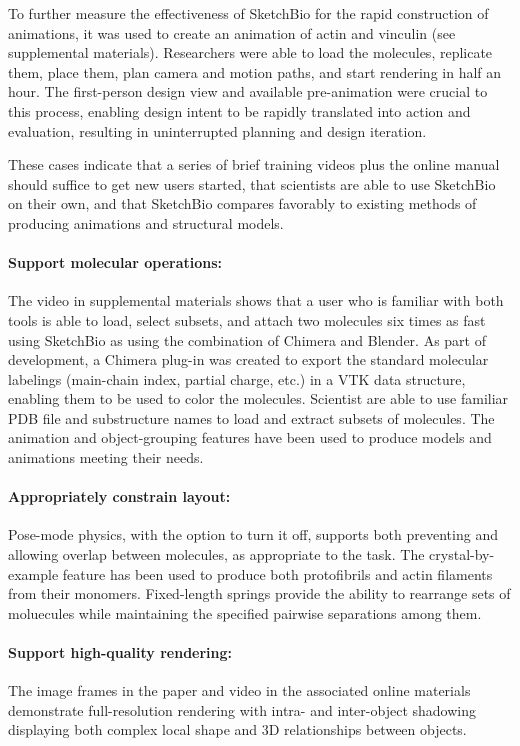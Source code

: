 \documentclass[twocolumn]{bmcart}%
\begin{document}
To further measure the effectiveness of SketchBio for the rapid construction of animations, it was used to create an animation of actin and vinculin (see supplemental materials).
Researchers were able to load the molecules, replicate them, place them, plan camera and motion paths, and start rendering in half an hour.
The first-person design view and available pre-animation were crucial to this process, enabling design intent to be rapidly translated into action and evaluation, resulting in uninterrupted planning and design iteration.

These cases indicate that a series of brief training videos plus the online manual should suffice to get new users started, that scientists are able to use SketchBio on their own, and that SketchBio compares favorably to existing methods of producing animations and structural models.

\paragraph*{Support molecular operations:}
The video in supplemental materials shows that a user who is familiar with both tools is able to load, select subsets, and attach two molecules six times as fast using SketchBio as using the combination of Chimera and Blender. As part of development, a Chimera plug-in was created to export the standard molecular labelings (main-chain index, partial charge, etc.) in a VTK data structure, enabling them to be used to color the molecules. Scientist are able to use familiar PDB file and substructure names to load and extract subsets of molecules. The animation and object-grouping features have been used to produce models and animations meeting their needs.

\paragraph*{Appropriately constrain layout:}
Pose-mode physics, with the option to turn it off, supports both preventing and allowing overlap between molecules, as appropriate to the task. The crystal-by-example feature has been used to produce both protofibrils and actin filaments from their monomers. Fixed-length springs provide the ability to rearrange sets of moluecules while maintaining the specified pairwise separations among them.

\paragraph*{Support high-quality rendering:}
The image frames in the paper and video in the associated online materials demonstrate full-resolution rendering with intra- and inter-object shadowing displaying both complex local shape and 3D relationships between objects.
\end{document}
